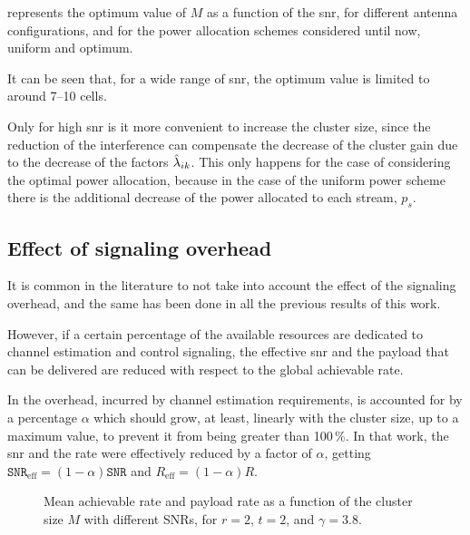  represents the optimum value of $M$ as a function of the
\gls{snr}, for different antenna configurations, and for the power allocation
schemes considered until now, uniform and optimum.

It can be seen that, for a wide range of \gls{snr}, the optimum value is limited
to around 7--10 cells.

Only for high \gls{snr} is it more convenient to increase the cluster size,
since the reduction of the interference can compensate the decrease of the
cluster gain due to the decrease of the factors $\hat{\lambda}_{ik}$. This only
happens for the case of considering the optimal power allocation, because in the
case of the uniform power scheme there is the additional decrease of the power
allocated to each stream, $p_s$.

\subsection{Effect of signaling overhead}\label{ssec:achiev_signal_overhead}

It is common in the literature to not take into account the effect of the
signaling overhead, and the same has been done in all the previous results of
this work.

However, if a certain percentage of the available resources are dedicated to
channel estimation and control signaling, the effective \gls{snr} and the
payload that can be delivered are reduced with respect to the global achievable
rate.

In \cite{lozano13} the overhead, incurred by channel estimation requirements, is
accounted for by a percentage $\alpha$ which should grow, at least, linearly
with the cluster size, up to a maximum value, to prevent it from being greater
than 100\,\%. In that work, the \gls{snr} and the rate were effectively reduced
by a factor of $\alpha$, getting $\mathtt{SNR}_{\text{eff}}=\left(1-\alpha
\right)\mathtt{SNR}$ and $R_{\text{eff}} = \left(1-\alpha\right)R$.

\begin{figure}[t]
\begin{center}
    
    \restoregeometry
\end{center}
\caption{Mean achievable rate and payload rate as a function of the cluster size
$M$ with different SNRs, for $r=2$, $t=2$, and $\gamma = 3.8$.}
\label{fig:signal_overhead}
\end{figure}


